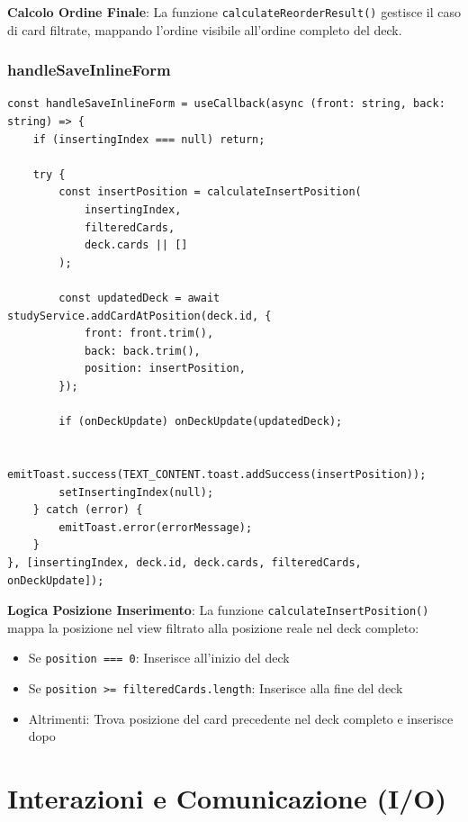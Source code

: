 \documentclass[11pt,a4paper]{article}
\begin{document}
\textbf{Calcolo Ordine Finale}: La funzione \texttt{calculateReorderResult()} gestisce il caso di card filtrate, mappando l'ordine visibile all'ordine completo del deck.

\subsubsection{handleSaveInlineForm}

\begin{lstlisting}[style=typescript, caption=Handler Salvataggio Form Inline]
const handleSaveInlineForm = useCallback(async (front: string, back: string) => {
    if (insertingIndex === null) return;
    
    try {
        const insertPosition = calculateInsertPosition(
            insertingIndex,
            filteredCards,
            deck.cards || []
        );
        
        const updatedDeck = await studyService.addCardAtPosition(deck.id, {
            front: front.trim(),
            back: back.trim(),
            position: insertPosition,
        });
        
        if (onDeckUpdate) onDeckUpdate(updatedDeck);
        
        emitToast.success(TEXT_CONTENT.toast.addSuccess(insertPosition));
        setInsertingIndex(null);
    } catch (error) {
        emitToast.error(errorMessage);
    }
}, [insertingIndex, deck.id, deck.cards, filteredCards, onDeckUpdate]);
\end{lstlisting}

\textbf{Logica Posizione Inserimento}: La funzione \texttt{calculateInsertPosition()} mappa la posizione nel view filtrato alla posizione reale nel deck completo:
\begin{itemize}
    \item Se \texttt{position === 0}: Inserisce all'inizio del deck
    \item Se \texttt{position >= filteredCards.length}: Inserisce alla fine del deck
    \item Altrimenti: Trova posizione del card precedente nel deck completo e inserisce dopo
\end{itemize}


\section{Interazioni e Comunicazione (I/O)}
\end{document}
